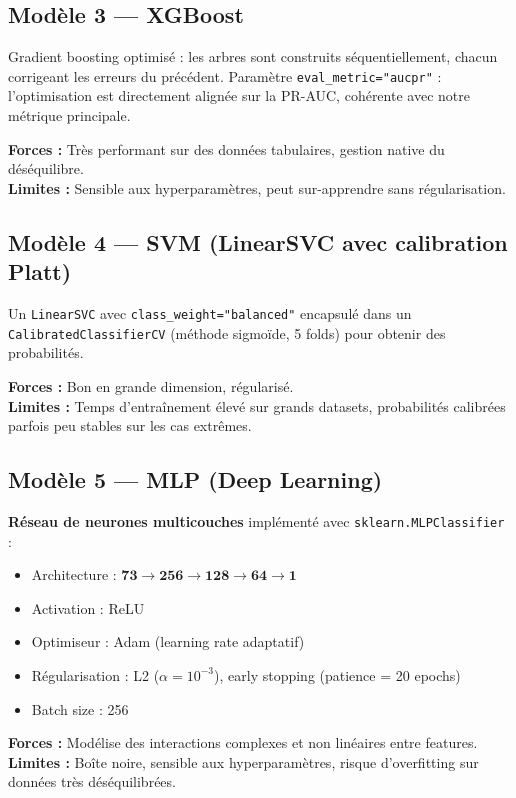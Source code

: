 \documentclass[12pt,a4paper]{report}
\begin{document}
\subsection{Modèle 3 — XGBoost}

Gradient boosting optimisé : les arbres sont construits séquentiellement, chacun corrigeant
les erreurs du précédent. Paramètre \texttt{eval\_metric="aucpr"} : l'optimisation est
directement alignée sur la PR-AUC, cohérente avec notre métrique principale.

\textbf{Forces :} Très performant sur des données tabulaires, gestion native du déséquilibre.\\
\textbf{Limites :} Sensible aux hyperparamètres, peut sur-apprendre sans régularisation.

\subsection{Modèle 4 — SVM (LinearSVC avec calibration Platt)}

Un \texttt{LinearSVC} avec \texttt{class\_weight="balanced"} encapsulé dans un
\texttt{CalibratedClassifierCV} (méthode sigmoïde, 5 folds) pour obtenir des probabilités.

\textbf{Forces :} Bon en grande dimension, régularisé.\\
\textbf{Limites :} Temps d'entraînement élevé sur grands datasets, probabilités calibrées
parfois peu stables sur les cas extrêmes.

\subsection{Modèle 5 — MLP (Deep Learning)}

\textbf{Réseau de neurones multicouches} implémenté avec \texttt{sklearn.MLPClassifier} :
\begin{itemize}
  \item Architecture : $\mathbf{73 \rightarrow 256 \rightarrow 128 \rightarrow 64 \rightarrow 1}$
  \item Activation : ReLU
  \item Optimiseur : Adam (learning rate adaptatif)
  \item Régularisation : L2 ($\alpha = 10^{-3}$), early stopping (patience = 20 epochs)
  \item Batch size : 256
\end{itemize}

\textbf{Forces :} Modélise des interactions complexes et non linéaires entre features.\\
\textbf{Limites :} Boîte noire, sensible aux hyperparamètres, risque d'overfitting
sur données très déséquilibrées.
\end{document}
